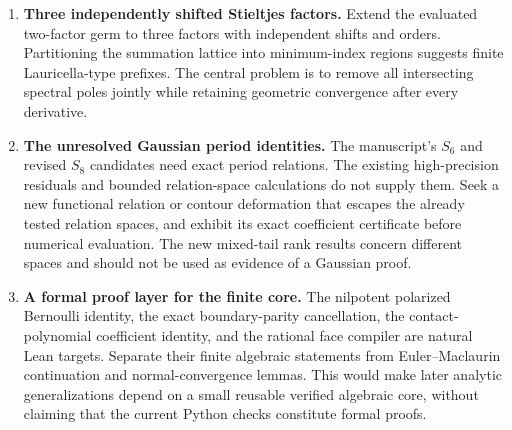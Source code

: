 \documentclass[11pt,letterpaper]{article}
\numberwithin{equation}{section}
\theoremstyle{definition}
\theoremstyle{remark}
\begin{document}
\begin{enumerate}[label=\textbf{Q\arabic*.},leftmargin=*]
\item \textbf{Three independently shifted Stieltjes factors.}
Extend the evaluated two-factor germ to three factors
with independent shifts and orders. Partitioning the
summation lattice into minimum-index regions suggests
finite Lauricella-type prefixes. The central problem is
to remove all intersecting spectral poles jointly while
retaining geometric convergence after every derivative.

\item \textbf{The unresolved Gaussian period identities.}
The manuscript's \(S_6\) and revised \(S_8\) candidates
need exact period relations. The existing high-precision
residuals and bounded relation-space calculations do
not supply them. Seek a new functional relation or
contour deformation that escapes the already tested
relation spaces, and exhibit its exact coefficient
certificate before numerical evaluation. The new
mixed-tail rank results concern different spaces and
should not be used as evidence of a Gaussian proof.

\item \textbf{A formal proof layer for the finite core.}
The nilpotent polarized Bernoulli identity, the exact
boundary-parity cancellation, the contact-polynomial
coefficient identity, and the rational face compiler
are natural Lean targets. Separate their finite
algebraic statements from Euler--Maclaurin continuation
and normal-convergence lemmas. This would make later
analytic generalizations depend on a small reusable
verified algebraic core, without claiming that the
current Python checks constitute formal proofs.
\end{enumerate}


\end{document}
